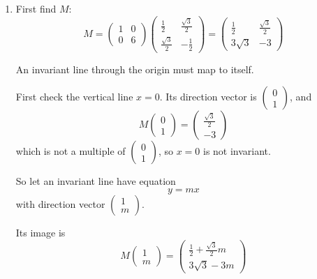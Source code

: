 \documentclass[leqno]{article}
\begin{document}
\begin{enumerate}[
  label=\textbf{\arabic*.},
  leftmargin=*,
  topsep=0pt,
  partopsep=0pt,
  parsep=0pt
]
\begin{tcolorbox}[colback=white, colframe=scarlet, title={\textbf{Solution}}, breakable, grow to left by=6mm, grow to right by=10mm]
\begin{enumerate}[label=\textbf{(\alph*)}]
Hence
\[
M^{-1}
=
\begin{pmatrix}
\frac12&\frac{\sqrt3}{2}\\[4pt]
\frac{\sqrt3}{2}&-\frac12
\end{pmatrix}
\begin{pmatrix}
1&0\\[4pt]
0&\frac16
\end{pmatrix}
\]

\item First find \(M\):
\[
M=
\begin{pmatrix}1&0\\0&6\end{pmatrix}
\begin{pmatrix}\frac12&\frac{\sqrt3}{2}\\[4pt]\frac{\sqrt3}{2}&-\frac12\end{pmatrix}
=
\begin{pmatrix}
\frac12&\frac{\sqrt3}{2}\\[4pt]
3\sqrt3&-3
\end{pmatrix}
\]

An invariant line through the origin must map to itself.

First check the vertical line \(x=0\). Its direction vector is \(\begin{pmatrix}0\\1\end{pmatrix}\), and
\[
M\begin{pmatrix}0\\1\end{pmatrix}
=
\begin{pmatrix}\frac{\sqrt3}{2}\\-3\end{pmatrix}
\]
which is not a multiple of \(\begin{pmatrix}0\\1\end{pmatrix}\), so \(x=0\) is not invariant.

So let an invariant line have equation
\[
y=mx
\]
with direction vector \(\begin{pmatrix}1\\m\end{pmatrix}\).

Its image is
\[
M\begin{pmatrix}1\\m\end{pmatrix}
=
\begin{pmatrix}
\frac12+\frac{\sqrt3}{2}m\\[4pt]
3\sqrt3-3m
\end{pmatrix}
\]


\end{enumerate}
\end{tcolorbox}
\end{enumerate}
\end{document}
